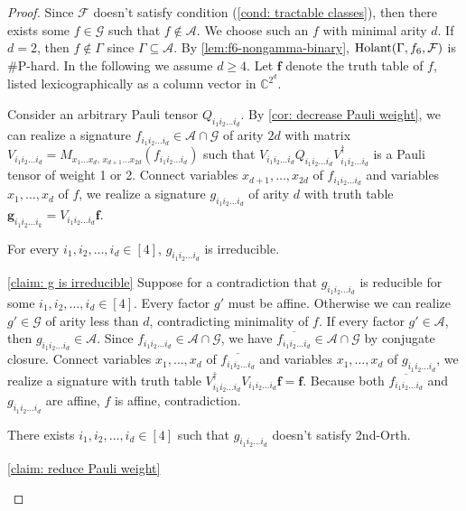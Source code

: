 \begin{proof}
    
    Since $\mathcal{F}$ doesn't satisfy condition (\ref{cond: tractable classes}), then there exists some $f\in \mathcal{G}$ such that $f\notin \mathscr{A}.$
    We choose such an $f$ with minimal arity $d$.
    If $d=2$, then $f\notin \Gamma$ since $\Gamma\subseteq \mathscr{A}$.
    By \cref{lem:f6-nongamma-binary}, $\operatorname{Holant}(\Gamma,f_6,\mathcal{F})$ is \#P-hard.
    In the following we assume $d\ge 4.$
    Let $\mathbf{f}$ denote the truth table of $f$, listed lexicographically as a column vector in $\mathbb{C}^{2^d}$.

    Consider an arbitrary Pauli tensor $Q_{i_1i_2\ldots i_d}.$
    By \cref{cor: decrease Pauli weight}, we can realize a signature $f_{i_1i_2\ldots i_d}\in \mathscr{A}\cap \mathcal{G}$ of arity $2d$ with matrix $V_{i_1i_2\ldots i_d}=M_{x_1\ldots x_d,\,x_{d+1}\ldots x_{2d}}(f_{i_1i_2\ldots i_d})$ such that $V_{i_1i_2\ldots i_d}Q_{i_1i_2\ldots i_d}V_{i_1i_2\ldots i_d}^\dagger$ is a Pauli tensor of weight 1 or 2.
    Connect variables $x_{d+1},\ldots, x_{2d}$ of $f_{i_1i_2\ldots i_d}$ and variables $x_1,\ldots, x_d$ of $f$, we realize a signature $g_{i_1i_2\ldots i_d}$ of arity $d$ with truth table $\mathbf{g}_{i_1i_2\ldots i_k}=V_{i_1i_2\ldots i_d}\mathbf{f}.$

    \begin{claim}\label{claim: g is irreducible}
        For every $i_1,i_2,\ldots, i_d\in [4]$, $g_{i_1i_2\ldots i_d}$ is irreducible. 
    \end{claim}
    \begin{claimproof}{\cref{claim: g is irreducible}}
        Suppose for a contradiction that $g_{i_1i_2\ldots i_d}$ is reducible for some $i_1,i_2,\ldots, i_d\in [4]$.
        Every factor $g'$ must be affine.
        Otherwise we can realize $g'\in \mathcal{G}$ of arity less than $d$, contradicting minimality of $f$.
        If every factor $g'\in \mathscr{A}$, then $g_{i_1i_2\ldots i_d}\in \mathscr{A}$.
        Since $f_{i_1i_2\ldots i_d}\in \mathscr{A}\cap \mathcal{G}$, we have $\overline{f_{i_1i_2\ldots i_d}}\in \mathscr{A}\cap \mathcal{G}$ by conjugate closure.
        Connect variables $x_{1},\ldots, x_{d}$ of $\overline{{f}_{i_1i_2\ldots i_d}}$ and variables $x_1,\ldots, x_d$ of $g_{i_1i_2\ldots i_d}$, we realize a signature with truth table $V_{i_1i_2\ldots i_d}^\dagger V_{i_1i_2\ldots i_d}\mathbf{f}=\mathbf{f}.$
        Because both $\overline{{f}_{i_1i_2\ldots i_d}}$ and $g_{i_1i_2\ldots i_d}$ are affine, $f$ is affine, contradiction.
    \end{claimproof}
    \begin{claim}\label{claim: reduce Pauli weight}
        There exists $i_1,i_2,\ldots, i_d\in [4]$ such that $g_{i_1i_2\ldots i_d}$ doesn't satisfy {\sc 2nd-Orth.}
    \end{claim}
    \begin{claimproof}{\cref{claim: reduce Pauli weight}}
        

\end{claimproof}
\end{proof}
